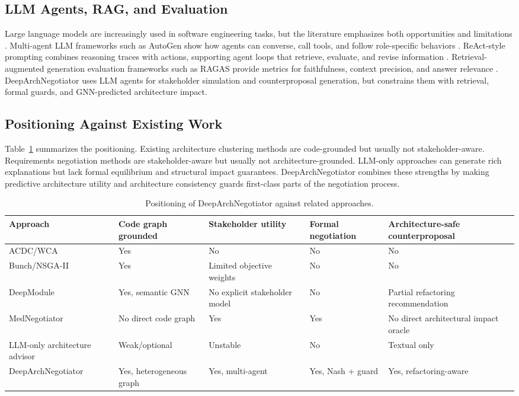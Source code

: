 \documentclass[english,preprint,nonatbib]{elsarticle}
\begin{document}
\subsection{LLM Agents, RAG, and Evaluation}

Large language models are increasingly used in software engineering tasks, but the literature emphasizes both opportunities and limitations \cite{hou2024llmse}.
Multi-agent LLM frameworks such as AutoGen show how agents can converse, call tools, and follow role-specific behaviors \cite{wu2023autogen}.
ReAct-style prompting combines reasoning traces with actions, supporting agent loops that retrieve, evaluate, and revise information \cite{yao2023react}.
Retrieval-augmented generation evaluation frameworks such as RAGAS provide metrics for faithfulness, context precision, and answer relevance \cite{es2024ragas}.
DeepArchNegotiator uses LLM agents for stakeholder simulation and counterproposal generation, but constrains them with retrieval, formal guards, and GNN-predicted architecture impact.

\subsection{Positioning Against Existing Work}

Table~\ref{tab:positioning} summarizes the positioning. Existing architecture clustering methods are code-grounded but usually not stakeholder-aware.
Requirements negotiation methods are stakeholder-aware but usually not architecture-grounded. LLM-only approaches can generate rich explanations but lack formal equilibrium and structural impact guarantees.
DeepArchNegotiator combines these strengths by making predictive architecture utility and architecture consistency guards first-class parts of the negotiation process.

\begin{table}[H]
\centering
\caption{Positioning of DeepArchNegotiator against related approaches.}
\label{tab:positioning}
\begin{tabular}{p{3.2cm}p{2.3cm}p{2.3cm}p{2.5cm}p{3.2cm}}
\toprule
Approach & Code graph grounded & Stakeholder utility & Formal negotiation & Architecture-safe counterproposal \\
\midrule
ACDC/WCA & Yes & No & No & No \\
Bunch/NSGA-II & Yes & Limited objective weights & No & No \\
DeepModule & Yes, semantic GNN & No explicit stakeholder model & No & Partial refactoring recommendation \\
MedNegotiator & No direct code graph & Yes & Yes & No direct architectural impact oracle \\
LLM-only architecture advisor & Weak/optional & Unstable & No & Textual only \\
DeepArchNegotiator & Yes, heterogeneous graph & Yes, multi-agent & Yes, Nash + guard & Yes, refactoring-aware \\
\bottomrule
\end{tabular}
\end{table}
\end{document}
